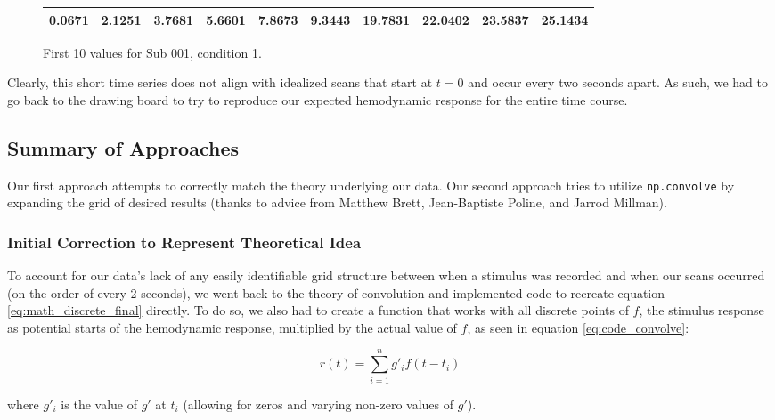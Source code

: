 \vspace{5mm}

\begin{figure}[ht]
\begin{center}
\begin{tabular}{|cccccccccc|}
  \hline
0.0671 &
2.1251 &
3.7681 &
5.6601 &
7.8673 &
9.3443 &
19.7831 &
22.0402 &
23.5837 &
25.1434 \\
 \hline

  \end{tabular}
   \caption{First 10 values for Sub 001, condition 1.}
  \label{table:cond1}
\end{center}
\end{figure}
 
Clearly, this short time series does not align with idealized scans that 
start at $t=0$ and occur every two seconds apart. As such, we had to go back 
to the drawing board to try to reproduce our expected hemodynamic response for 
the entire time course.


\subsection{Summary of Approaches}
Our first approach attempts to correctly match the theory underlying our data. 
Our second approach tries to utilize \texttt{np.convolve} by expanding the 
grid of desired results (thanks to advice from  Matthew Brett, Jean-Baptiste 
Poline, and Jarrod Millman).


\subsubsection{Initial Correction to Represent Theoretical Idea}
To account for our data's lack of any easily identifiable grid structure 
between when a stimulus was recorded and when our scans occurred (on the 
order of every 2 seconds), we went back to the theory of convolution and 
implemented code to recreate equation \ref{eq:math_discrete_final} directly. 
To do so, we also had to create a function that works with all discrete points 
of $f$, the stimulus response as potential starts of the hemodynamic response, 
multiplied by the actual value of $f$, as seen in equation 
\ref{eq:code_convolve}:

\begin{equation} \label{eq:code_convolve}
r(t)= \sum_{i=1}^n g'_{i} f(t-t_i)
\end{equation}

where $g'_{i}$ is the value of $g'$ at $t_i$ (allowing for zeros and varying 
non-zero values of $g'$).



